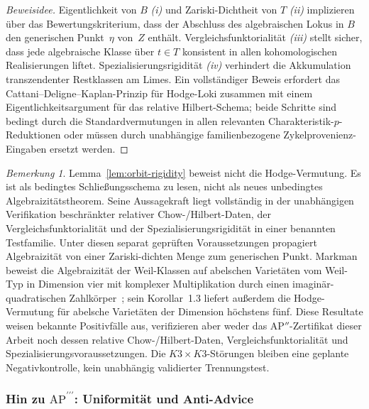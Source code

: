 \documentclass[aps,prd,twocolumn,superscriptaddress,nofootinbib]{revtex4-2}
\theoremstyle{definition}
\theoremstyle{remark}
\newtheorem{remark}[theorem]{Bemerkung}
\begin{document}
\begin{proof}[Beweisidee]
Eigentlichkeit von $B$ \emph{(i)} und Zariski-Dichtheit von $T$ \emph{(ii)}
implizieren über das Bewertungskriterium, dass der Abschluss des
algebraischen Lokus in $B$ den generischen Punkt~$\eta$ von~$Z$ enthält.
Vergleichsfunktorialität \emph{(iii)} stellt sicher, dass jede algebraische
Klasse über $t\in T$ konsistent in allen kohomologischen Realisierungen
liftet.  Spezialisierungsrigidität \emph{(iv)} verhindert die Akkumulation
transzendenter Restklassen am Limes.  Ein vollständiger Beweis erfordert
das Cattani--Deligne--Kaplan-Prinzip für Hodge-Loki
\cite{CattaniDeligneKaplan1995} zusammen mit einem Eigentlichkeitsargument
für das relative Hilbert-Schema; beide Schritte sind bedingt durch die
Standardvermutungen in allen relevanten Charakteristik-$p$-Reduktionen oder
müssen durch unabhängige familienbezogene Zykelprovenienz-Eingaben ersetzt
werden.
\end{proof}

\begin{remark}
\label{rem:ap-double-prime}
Lemma~\ref{lem:orbit-rigidity} beweist nicht die Hodge-Vermutung.
Es ist als bedingtes Schließungsschema zu lesen, nicht als neues
unbedingtes Algebraizitätstheorem. Seine Aussagekraft liegt vollständig in
der unabhängigen Verifikation beschränkter relativer Chow-/Hilbert-Daten,
der Vergleichsfunktorialität und der Spezialisierungsrigidität in einer
benannten Testfamilie. Unter diesen separat geprüften Voraussetzungen
propagiert Algebraizität von einer Zariski-dichten Menge zum generischen
Punkt.  Markman beweist die Algebraizität der Weil-Klassen auf abelschen Varietäten vom Weil-Typ in Dimension vier mit komplexer Multiplikation durch einen imaginär-quadratischen Zahlkörper~\cite{Markman2025}; sein Korollar~1.3 liefert außerdem die Hodge-Vermutung für abelsche Varietäten der Dimension höchstens fünf.  Diese Resultate weisen bekannte Positivfälle aus, verifizieren aber weder das AP$''$-Zertifikat dieser Arbeit noch dessen relative Chow-/Hilbert-Daten, Vergleichsfunktorialität und Spezialisierungsvoraussetzungen.  Die $K3\times K3$-Störungen bleiben eine geplante Negativkontrolle, kein unabhängig validierter Trennungstest.
\end{remark}

\subsubsection*{Hin zu \texorpdfstring{$\mathrm{AP}^{\prime\prime\prime}$}{AP'''}: Uniformität und Anti-Advice}
\label{subsec:ap-triple-prime}
\end{document}
